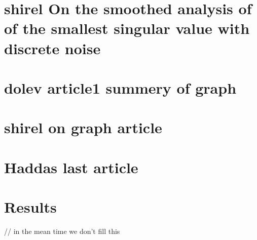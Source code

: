 \documentclass[12pt]{article}
\begin{document}
\section{shirel On the smoothed analysis of of the smallest singular value with discrete noise}



\section{dolev article1 summery of graph}



\section{shirel on graph article}



\section{Haddas last article}



\section{Results}
// in the mean time we don't fill this

\newpage
\printbibliography
\end{document}
